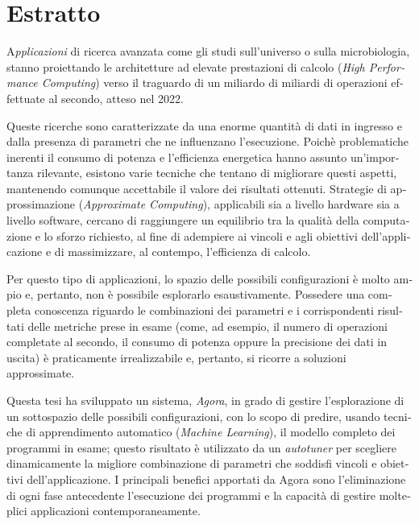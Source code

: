 \chapter*{Estratto}

\begin{otherlanguage}{italian}

\lettrine{A}{}\textit{pplicazioni} di ricerca avanzata come gli studi sull'universo o sulla microbiologia, stanno proiettando le architetture ad elevate prestazioni di calcolo (\textit{High Performance Computing}) verso il traguardo di un miliardo di miliardi di operazioni effettuate al secondo, atteso nel 2022.

Queste ricerche sono caratterizzate da una enorme quantità di dati in ingresso e dalla presenza di parametri che ne influenzano l'esecuzione. Poichè problematiche inerenti il consumo di potenza e l'efficienza energetica hanno assunto un'importanza rilevante, esistono varie tecniche che tentano di migliorare questi aspetti, mantenendo comunque accettabile il valore dei risultati ottenuti. Strategie di approssimazione (\textit{Ap\-prox\-i\-mate Com\-put\-ing}), applicabili sia a livello hardware sia a livello software, cercano di raggiungere un equilibrio tra la qualità della computazione e lo sforzo richiesto, al fine di adempiere ai vincoli e agli obiettivi dell'applicazione e di massimizzare, al contempo, l'efficienza di calcolo.

Per questo tipo di applicazioni, lo spazio delle possibili configurazioni è molto ampio e, pertanto, non è possibile esplorarlo esaustivamente. Possedere una completa conoscenza riguardo le combinazioni dei parametri e i corrispondenti risultati delle metriche prese in esame (come, ad esempio, il numero di operazioni completate al secondo, il consumo di potenza oppure la precisione dei dati in uscita) è praticamente irrealizzabile e, pertanto, si ricorre a soluzioni approssimate.

Questa tesi ha sviluppato un sistema, \textit{Agora}, in grado di gestire l'esplorazione di un sottospazio delle possibili configurazioni, con lo scopo di predire, usando tecniche di apprendimento automatico (\textit{Machine Learning}), il modello completo dei programmi in esame; questo risultato è utilizzato da un \textit{autotuner} per sce\-glie\-re dinamicamente la migliore combinazione di parametri che soddisfi vincoli e obiettivi dell'applicazione. I principali benefici apportati da Agora sono l'eliminazione di ogni fase an\-te\-ce\-den\-te l'esecuzione dei programmi e la capacità di gestire molteplici applicazioni contemporaneamente.

\end{otherlanguage}
